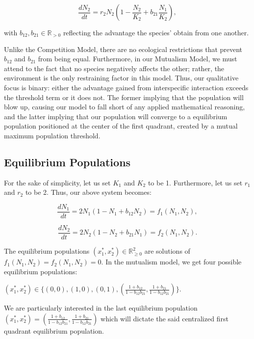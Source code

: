\documentclass[11pt,a4paper]{scrartcl}
\theoremstyle{definition}
\begin{document}
\begin{equation} \label{eq19}
	\frac{dN_2}{dt}=r_2N_2(1-\frac{N_2}{K_2}+b_{21}\frac{N_1}{K_2}),
\end{equation}

with $b_{12}, b_{21} \in \mathbb{R}_{>0}$ reflecting the advantage the species' obtain from one another.

Unlike the Competition Model, there are no ecological restrictions that prevent $b_{12}$ and $b_{21}$ from being equal. Furthermore, in our Mutualism Model, we must attend to the fact that no species negatively affects the other; rather, the environment is the only restraining factor in this model. Thus, our qualitative focus is binary: either the advantage gained from interspecific interaction exceeds the threshold term or it does not. The former implying that the population will blow up, causing our model to fall short of any applied mathematical reasoning, and the latter implying that our population will converge to a equilibrium population positioned at the center of the first quadrant, created by a mutual maximum population threshold.
\newline

\subsection{Equilibrium Populations}

For the sake of simplicity, let us set $K_1$ and $K_2$ to be 1. Furthermore, let us set $r_1$ and $r_2$ to be 2. Thus, our above system becomes:

\begin{equation} \label{eq20}
	\frac{dN_1}{dt}=2N_1(1-N_1+b_{12}N_2)=f_1(N_1, N_2),
\end{equation}

\begin{equation} \label{eq21}
	\frac{dN_2}{dt}=2N_2(1-N_2+b_{21}N_1)=f_2(N_1, N_2).
\end{equation}

The equilibrium populations $(x_1^{*}, x_2^{*}) \in \mathbb{R}^2_{\geqslant 0}$ are solutions of $f_1(N_1, N_2)=f_2(N_1, N_2)=0$. In the mutualism model, we get four possible equilibrium populations:

\begin{center}
	$(x_1^{*}, x_2^{*}) \in \Big\{(0,0), (1,0), (0,1), (\frac{1+b_{12}}{1-b_{12}b_{21}}, \frac{1+b_{21}}{1-b_{12}b_{21}})\Big\}$.
\end{center}

We are particularly interested in the last equilibrium population $(x_1^{*}, x_2^{*})=(\frac{1+b_{12}}{1-b_{12}b_{21}}, \frac{1+b_{21}}{1-b_{12}b_{21}})$ which will dictate the said centralized first quadrant equilibrium population.\newline
\end{document}
